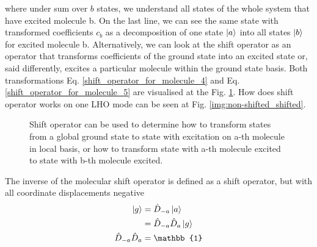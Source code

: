 where under sum over $b$ states, we understand all states of the whole system that have excited molecule b. On the last line, we can see the same state with transformed coefficients $c_b$ as a decomposition of one state $\ket{a}$ into all states $\ket{b}$ for excited molecule b. Alternatively, we can look at the shift operator as an operator that transforms coefficients of the ground state into an excited state or, said differently, excites a particular molecule within the ground state basis. Both transformations Eq. \ref{shift_operator_for_molecule_4} and Eq. \ref{shift_operator_for_molecule_5} are visualised at the Fig. \ref{img:base_transformation}. How does shift operator works on one LHO mode can be seen at Fig. \ref{img:non-shifted_shifted}.

\begin{figure}
\centering
{}
\caption{Shift operator can be used to determine how to transform states from a global ground state to state with excitation on a-th molecule in local basis, or how to transform state with a-th molecule excited to state with b-th molecule excited.}
\label{img:base_transformation}
\end{figure}

The inverse of the molecular shift operator is defined as a shift operator, but with all coordinate displacements negative
\begin{equation}
    \begin{aligned}
    \ket{g} &= \hat{D}_{-a} \ket{a} \\
    &= \hat{D}_{-a} \hat{D}_{a} \ket{g} \\
    \hat{D}_{-a} \hat{D}_{a} &= \mathbb{1}
    \end{aligned}
\end{equation}

